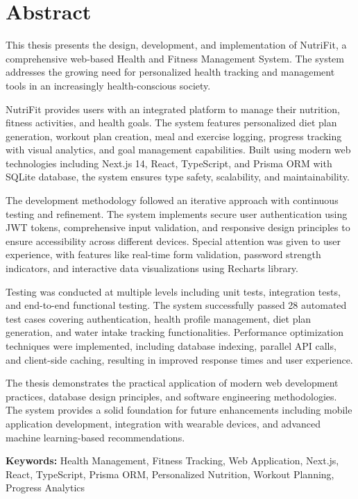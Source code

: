 \chapter*{Abstract}

This thesis presents the design, development, and implementation of NutriFit, a comprehensive web-based Health and Fitness Management System. The system addresses the growing need for personalized health tracking and management tools in an increasingly health-conscious society.

NutriFit provides users with an integrated platform to manage their nutrition, fitness activities, and health goals. The system features personalized diet plan generation, workout plan creation, meal and exercise logging, progress tracking with visual analytics, and goal management capabilities. Built using modern web technologies including Next.js 14, React, TypeScript, and Prisma ORM with SQLite database, the system ensures type safety, scalability, and maintainability.

The development methodology followed an iterative approach with continuous testing and refinement. The system implements secure user authentication using JWT tokens, comprehensive input validation, and responsive design principles to ensure accessibility across different devices. Special attention was given to user experience, with features like real-time form validation, password strength indicators, and interactive data visualizations using Recharts library.

Testing was conducted at multiple levels including unit tests, integration tests, and end-to-end functional testing. The system successfully passed 28 automated test cases covering authentication, health profile management, diet plan generation, and water intake tracking functionalities. Performance optimization techniques were implemented, including database indexing, parallel API calls, and client-side caching, resulting in improved response times and user experience.

The thesis demonstrates the practical application of modern web development practices, database design principles, and software engineering methodologies. The system provides a solid foundation for future enhancements including mobile application development, integration with wearable devices, and advanced machine learning-based recommendations.

\textbf{Keywords:} Health Management, Fitness Tracking, Web Application, Next.js, React, TypeScript, Prisma ORM, Personalized Nutrition, Workout Planning, Progress Analytics

\newpage
